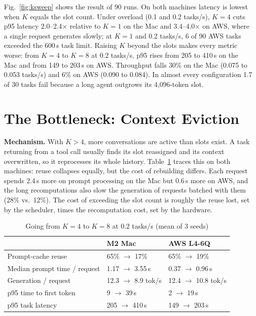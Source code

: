 \documentclass[conference,letterpaper]{IEEEtran}
\begin{document}
Fig.~\ref{fig:ksweep} shows the result of 90 runs. On both machines latency is lowest when $K$ equals the slot count. Under overload (0.1 and 0.2 tasks/s), $K=4$ cuts p95 latency 2.0--2.4$\times$ relative to $K=1$ on the Mac and 3.4--4.0$\times$ on AWS, where a single request generates slowly; at $K=1$ and 0.2 tasks/s, 6 of 90 AWS tasks exceeded the 600\,s task limit. Raising $K$ beyond the slots makes every metric worse: from $K=4$ to $K=8$ at 0.2 tasks/s, p95 rises from 205 to 410\,s on the Mac and from 149 to 203\,s on AWS. Throughput falls 30\% on the Mac (0.075 to 0.053 tasks/s) and 6\% on AWS (0.090 to 0.084). In almost every configuration 1.7 of 30 tasks fail because a long agent outgrows its 4,096-token slot.

\section{The Bottleneck: Context Eviction}
\textbf{Mechanism.} With $K>4$, more conversations are active than slots exist. A task returning from a tool call usually finds its slot reassigned and its context overwritten, so it reprocesses its whole history. Table~\ref{tab:mech} traces this on both machines: reuse collapses equally, but the cost of rebuilding differs. Each request spends 2.4\,s more on prompt processing on the Mac but 0.6\,s more on AWS, and the long recomputations also slow the generation of requests batched with them (28\% vs.\ 12\%). The cost of exceeding the slot count is roughly the reuse lost, set by the scheduler, times the recomputation cost, set by the hardware.

\begin{table}[t]
\caption{Going from $K=4$ to $K=8$ at 0.2 tasks/s (mean of 3 seeds)}
\label{tab:mech}
\centering\footnotesize
\begin{tabular}{@{}lll@{}}
\toprule
 & M2 Mac & AWS L4-6Q \\
\midrule
Prompt-cache reuse & 65\% $\rightarrow$ 17\% & 65\% $\rightarrow$ 19\% \\
Median prompt time / request & 1.17 $\rightarrow$ 3.55\,s & 0.37 $\rightarrow$ 0.96\,s \\
Generation / request & 12.3 $\rightarrow$ 8.9 tok/s & 12.4 $\rightarrow$ 10.8 tok/s \\
p95 time to first token & 9 $\rightarrow$ 39\,s & 2 $\rightarrow$ 19\,s \\
p95 task latency & 205 $\rightarrow$ 410\,s & 149 $\rightarrow$ 203\,s \\
\bottomrule
\end{tabular}
\end{table}
\end{document}

